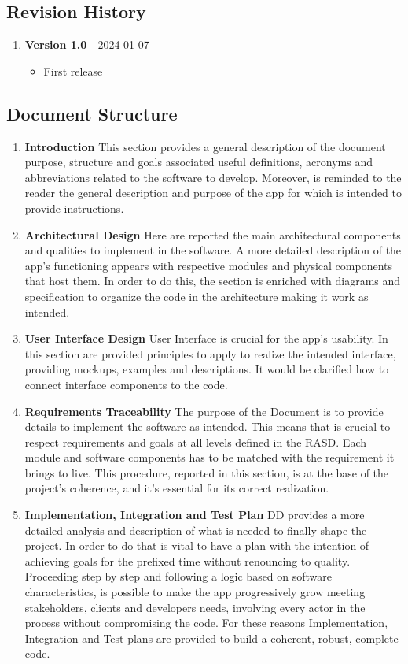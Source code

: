 \subsection{Revision History}
\newcommand{\release}[2]{
    \item \textbf{Version #1} - #2
}
\begin{enumerate}[label=$\bullet$]
    \release{1.0}{2024-01-07}
    \begin{itemize}
        \item First release
    \end{itemize}
\end{enumerate}

\subsection{Document Structure}
\begin{enumerate}
    \item \textbf{Introduction} This section provides a general description of the document purpose, structure and goals associated useful definitions, acronyms and abbreviations related to the software to develop. Moreover, is reminded to the reader the general description and purpose of the app for which is intended to provide instructions.
    \item \textbf{Architectural Design} Here are reported the main architectural components and qualities to implement in the software. A more detailed description of the app's functioning appears with respective modules and physical components that host them. In order to do this, the section is enriched with diagrams and specification to organize the code in the architecture making it work as intended.
    \item \textbf{User Interface Design} User Interface is crucial for the app's usability. In this section are provided principles to apply to realize the intended interface, providing mockups, examples and descriptions. It would be clarified how to connect interface components to the code.
    \item \textbf{Requirements Traceability} The purpose of the Document is to provide details to implement the software as intended. This means that is crucial to respect requirements and goals at all levels defined in the RASD. Each module and software components has to be matched with the requirement it brings to live. This procedure, reported in this section, is at the base of the project's coherence, and it's essential for its correct realization.
    \item \textbf{Implementation, Integration and Test Plan} DD provides a more detailed analysis and description of what is needed to finally shape the project. In order to do that is vital to have a plan with the intention of achieving goals for the prefixed time without renouncing to quality. Proceeding step by step and following a logic based on software characteristics, is possible to make the app progressively grow meeting stakeholders, clients and developers needs, involving every actor in the process without compromising the code. For these reasons Implementation, Integration and Test plans are provided to build a coherent, robust, complete code.
\end{enumerate}
